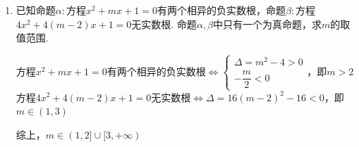 \begin{enumerate}
\begin{enumerate}
    \end{enumerate}
    \begin{jieda}
        \begin{enumerate}
            \item $p$假$q$真，所以$p$或$q$真、$p$且$q$假、非$p$真
            \item $p$真$q$假，所以$p$或$q$真、$p$且$q$假、非$p$假
            \item $p$真$q$真，所以$p$或$q$真、$p$且$q$真、非$p$假
            \item $p$假$q$假，所以$p$或$q$假、$p$且$q$假、非$p$真
        \end{enumerate}
    \end{jieda}
    \item 已知命题$\alpha:$方程$x^2+mx+1 = 0$有两个相异的负实数根，命题$\beta:$方程$4x^2+4(m-2)x+1 = 0$无实数根. 命题$\alpha, \beta$中只有一个为真命题，求$m$的取值范围.
    \begin{jieda}
        方程$x^2+mx+1 = 0$有两个相异的负实数根$\Longleftrightarrow \left \{\begin{array}{l}
             \Delta = m^2 - 4 > 0 \\
             -\dfrac{m}{2} < 0
        \end{array}\right.$，即$m > 2$ \\
        方程$4x^2+4(m-2)x+1 = 0$无实数根$\Longleftrightarrow \Delta = 16(m-2)^2-16 < 0$，即$m \in (1, 3)$ \\
        综上，$m \in (1, 2] \cup [3, +\infty)$
    \end{jieda}
\end{enumerate}


